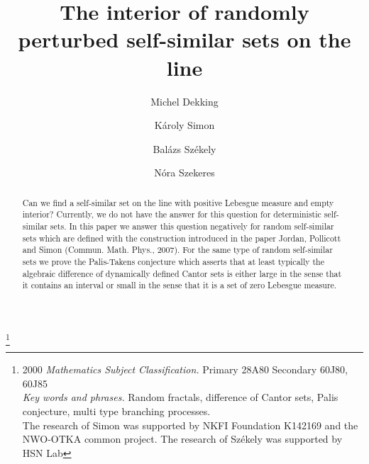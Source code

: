 \documentclass[amssymb,amsfonts,12pt,verbatim,righttag,oneside]{amsart}
\numberwithin{equation}{section} %
\theoremstyle{plain}
\newcommand*{\clrred}[1]{{\color{red} #1}}
\newcommand{\fm}{\ensuremath{\clrred{}}}
\theoremstyle{plain}
\begin{document}
\baselineskip 18pt


\title{The interior of randomly perturbed self-similar sets on the line}

\author{Michel Dekking}
\address{Michel Dekking,\fm CWI, Amsterdam and Delft Institute of Applied Mathematics,
 Technical University of Delft,  The Netherlands
}

\author{K\'{a}roly Simon}
\address{K\'{a}roly Simon,
Department of Stochastics, Budapest University of
Technology and Economics,
MTA-BME Stochastics Research Group, Budapest University of Technology and
Economics, Műegyetem rkp. 3, H-1111 Budapest, Hungary,
Alfr\'ed R\'enyi Institute, Hungary
}

\author{Bal\'{a}zs Sz\'{e}kely}
\address{Bal\'{a}zs Sz\'{e}kely, Department of Stochastics, Budapest University of
Technology and Economics, H-1529 B.O.box 91, Hungary
}

\author{N\'{o}ra Szekeres}
\address{N\'{o}ra Szekeres, Department of Stochastics, Budapest University of
Technology and Economics, H-1529 B.O.box 91, Hungary
}


 \thanks{2000 {\em Mathematics Subject Classification.} Primary
28A80 Secondary 60J80, 60J85
\\ \indent
{\em Key words and phrases.} Random fractals,  difference of
Cantor sets, Palis conjecture, multi type branching
 processes.\\
\indent The research of Simon was supported by NKFI Foundation
K142169  and the NWO-OTKA common project. The research of
Sz\'{e}kely was supported by HSN Lab}






\begin{abstract} Can we find a self-similar set on the line with positive Lebesgue measure and empty interior?  Currently, we do not have the answer for this question for deterministic self-similar sets. In this paper we answer  this question negatively for random self-similar sets   which are defined with the construction introduced in the paper
Jordan, Pollicott and Simon (Commun. Math. Phys., 2007). For the same type of random self-similar sets we prove the Palis-Takens conjecture which asserts that
at least typically the algebraic difference of dynamically defined Cantor sets is either large in the sense that it contains an interval or small in the sense that it is a set of zero Lebesgue measure.
\end{abstract}
\end{document}
